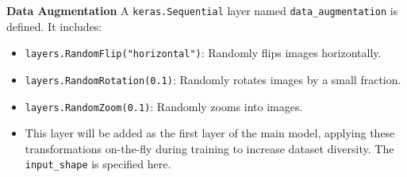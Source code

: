 \textbf{Data Augmentation}
A \verb|keras.Sequential| layer named \verb|data_augmentation| is defined. It includes:
\begin{itemize}
    \item \verb|layers.RandomFlip("horizontal")|: Randomly flips images horizontally.
    \item \verb|layers.RandomRotation(0.1)|: Randomly rotates images by a small fraction.
    \item \verb|layers.RandomZoom(0.1)|: Randomly zooms into images.
    \item This layer will be added as the first layer of the main model, applying these transformations on-the-fly during training to increase dataset diversity. The \verb|input_shape| is specified here.
\end{itemize}

